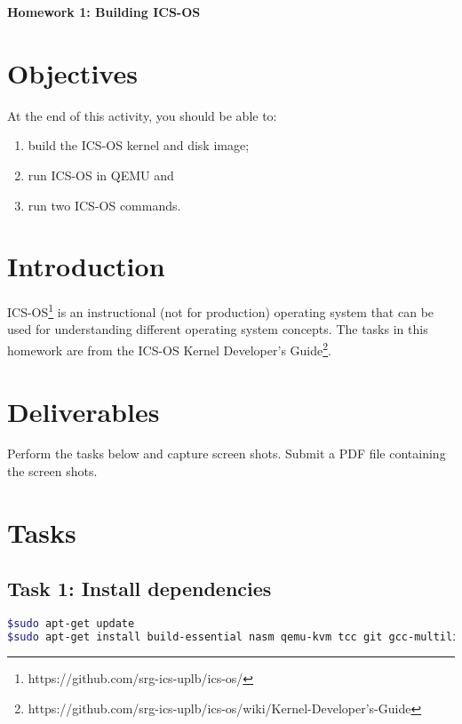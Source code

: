 \documentclass[a4paper, 11pt,oneside]{article}
\begin{document}
\begin{center}
	{\LARGE \textbf{Homework 1: Building ICS-OS}}
\end{center}


\section*{Objectives}
   At the end of this activity, you should be able to:
   \begin{enumerate}
       \item build the ICS-OS kernel and disk image;
       \item run ICS-OS in QEMU and
       \item run two ICS-OS commands.
   \end{enumerate}   

\section{Introduction}
ICS-OS\footnote{https://github.com/srg-ics-uplb/ics-os/} is an instructional (not for production) operating system that can be used for understanding different operating system concepts. The tasks
 in this homework are from the ICS-OS Kernel Developer's Guide\footnote{https://github.com/srg-ics-uplb/ics-os/wiki/Kernel-Developer's-Guide}.


\section{Deliverables}
Perform the tasks below and capture screen shots. Submit a PDF file 
containing the screen shots. 


\section{Tasks}

\subsection*{Task 1: Install dependencies}
\begin{lstlisting}[language=bash,frame=single]
$sudo apt-get update
$sudo apt-get install build-essential nasm qemu-kvm tcc git gcc-multilib
\end{lstlisting}
\end{document}
